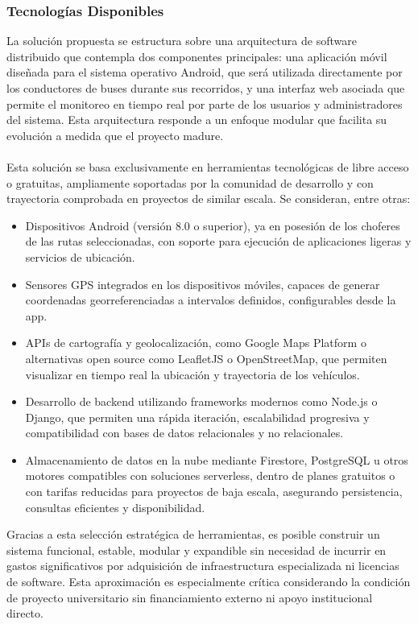 \documentclass[12pt]{article}
\begin{document}
\subsubsection{Tecnologías Disponibles}
La solución propuesta se estructura sobre una arquitectura de software distribuido que contempla dos componentes principales: una aplicación móvil diseñada para el sistema operativo Android, que será utilizada directamente por los conductores de buses durante sus recorridos, y una interfaz web asociada que permite el monitoreo en tiempo real por parte de los usuarios y administradores del sistema. Esta arquitectura responde a un enfoque modular que facilita su evolución a medida que el proyecto madure. 
\\\\
Esta solución se basa exclusivamente en herramientas tecnológicas de libre acceso o gratuitas, ampliamente soportadas por la comunidad de desarrollo y con trayectoria comprobada en proyectos de similar escala. Se consideran, entre otras: 
\begin{itemize}
    \item Dispositivos Android (versión 8.0 o superior), ya en posesión de los choferes de las rutas seleccionadas, con soporte para ejecución de aplicaciones ligeras y servicios de ubicación. 

    \item Sensores GPS integrados en los dispositivos móviles, capaces de generar coordenadas georreferenciadas a intervalos definidos, configurables desde la app. 

    \item APIs de cartografía y geolocalización, como Google Maps Platform o alternativas open source como LeafletJS o OpenStreetMap, que permiten visualizar en tiempo real la ubicación y trayectoria de los vehículos.
    
    \item Desarrollo de backend utilizando frameworks modernos como Node.js o Django, que permiten una rápida iteración, escalabilidad progresiva y compatibilidad con bases de datos relacionales y no relacionales. 

    \item Almacenamiento de datos en la nube mediante Firestore, PostgreSQL u otros motores compatibles con soluciones serverless, dentro de planes gratuitos o con tarifas reducidas para proyectos de baja escala, asegurando persistencia, consultas eficientes y disponibilidad. 
\end{itemize}
Gracias a esta selección estratégica de herramientas, es posible construir un sistema funcional, estable, modular y expandible sin necesidad de incurrir en gastos significativos por adquisición de infraestructura especializada ni licencias de software. Esta aproximación es especialmente crítica considerando la condición de proyecto universitario sin financiamiento externo ni apoyo institucional directo. 
\newpage
\end{document}

